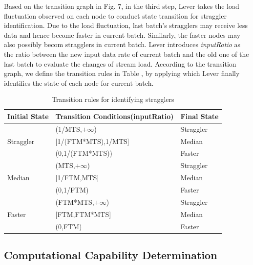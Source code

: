 \documentclass[10pt,conference,compsocconf,letterpaper]{IEEEtran}
\begin{document}
  Based on the transition graph in Fig. 7, in the third step, Lever takes the load fluctuation observed on each node to conduct state transition for straggler identification. Due to the load fluctuation, last batch's stragglers may receive less data and hence become faster in current batch. Similarly, the faster nodes may also possibly becom stragglers in current batch. Lever introduces \emph{inputRatio} as the ratio between the new input data rate of current batch and the old one of the last batch to evaluate the changes of stream load. According to the transition graph, we define the transition rules in Table \uppercase\expandafter{}, by applying which Lever finally identifies the state of each node for current batch.
  \begin{table}[htbp]
    \footnotesize
    \centering
    \caption{Transition rules for identifying stragglers}
    \begin{threeparttable}
    \centering
      \begin{tabular}{|p{1.5cm}|p{4.3cm}|p{1.4cm}|}
        \hline
        Initial State & Transition Conditions(inputRatio) & Final State \\
        \hline
        \multirow{3}{2cm}{Straggler} &
        (1/MTS,$+\infty$) & Straggler \\
        \cline{2-3}
        & [1/(FTM*MTS),1/MTS] & Median \\
        \cline{2-3}
        & (0,1/(FTM*MTS)) & Faster \\
        \hline
        \multirow{3}{2cm}{Median} &
        (MTS,$+\infty$) & Straggler \\
        \cline{2-3}
        & [1/FTM,MTS] & Median \\
        \cline{2-3}
        & (0,1/FTM) & Faster \\
        \hline
        \multirow{3}{2cm}{Faster} &
        (FTM*MTS,$+\infty$) & Straggler \\
        \cline{2-3}
        & [FTM,FTM*MTS] & Median \\
        \cline{2-3}
        & (0,FTM) & Faster \\
        \hline
      \end{tabular}
    \end{threeparttable}
    \label{Table1}
  \end{table}

\subsection{Computational Capability Determination}
\end{document}
